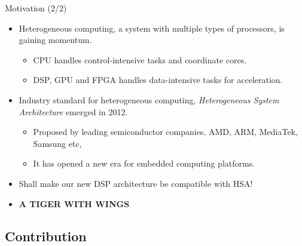 \documentclass{beamer}
\begin{document}
\begin{CJK}{UTF8}{bkai}
    \begin{frame}{Motivation (2/2)}
        \begin{itemize}
            \item {
                    Heterogeneous computing, a system with multiple types of processors, is gaining momentum.
                    \begin{itemize}
                        \item {
                                CPU handles control-intensive tasks and coordinate cores.
                            }
                        \item {
                                DSP, GPU and FPGA handles data-intensive tasks for acceleration.
                            }
                        \end{itemize}
                }
            \item {
                    Industry standard for heterogeneous computing, \textit{Heterogeneous System Architecture} emerged in 2012.
                    \begin{itemize}
                        \item {
                                Proposed by leading semiconductor companies, AMD, ARM, MediaTek, Samsung etc, 
                            }
                        \item {
                                It has opened a new era for embedded computing platforms.
                            }
                        \end{itemize}
                }
            \item
                Shall make our new DSP architecture be compatible with HSA!
            \item
                \large{\textbf{A TIGER WITH WINGS}}
        \end{itemize}
    \end{frame}


    \subsection{Contribution}


\end{CJK}
\end{document}
